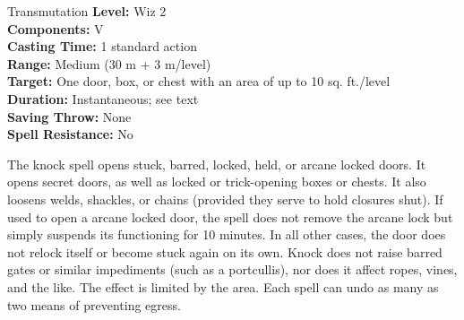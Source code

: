 {Transmutation}
{
	\textbf{Level:}
	Wiz 2\\
	\textbf{Components:}
	V\\
	\textbf{Casting Time:}
	1 standard action\\
	\textbf{Range:}
	Medium (30 m + 3 m/level)\\
	\textbf{Target:}
	One door, box, or chest with an area of up to 10 sq. ft./level\\
	\textbf{Duration:}
	Instantaneous; see text\\
	\textbf{Saving Throw:}
	None\\
	\textbf{Spell Resistance:}
	No\\
}
{
	The knock spell opens stuck, barred, locked, held, or arcane locked doors. It opens secret doors, as well as locked or trick-opening boxes or chests. It also loosens welds, shackles, or chains (provided they serve to hold closures shut). If used to open a arcane locked door, the spell does not remove the arcane lock but simply suspends its functioning for 10 minutes. In all other cases, the door does not relock itself or become stuck again on its own. Knock does not raise barred gates or similar impediments (such as a portcullis), nor does it affect ropes, vines, and the like. The effect is limited by the area. Each spell can undo as many as two means of preventing egress.

}
